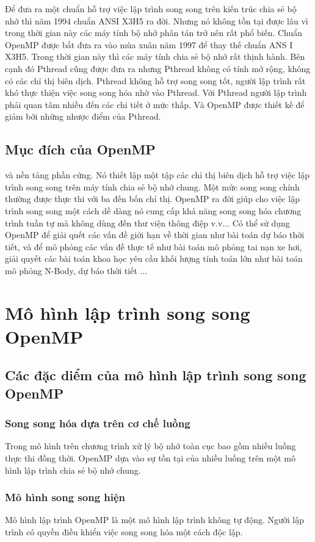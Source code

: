 \documentclass{report}
\begin{document}
Để đưa ra một chuẩn hỗ trợ việc lập trình song song trên kiến trúc chia sẻ bộ
nhớ thì năm 1994 chuẩn ANSI X3H5 ra đời. Nhưng nó không tồn tại được lâu vì trong
thời gian này các máy tính bộ nhớ phân tán trở nên rất phổ biến. Chuẩn OpenMP được
bắt đưa ra vào mùa xuân năm 1997 để thay thế chuẩn ANS
I X3H5. Trong thời gian
này thì các máy tính chia sẻ bộ nhớ rất thịnh hành.
Bên cạnh đó Pthread cũng được đưa ra nhưng Pthread không có tính mở rộng,
không có các chỉ thị biên dịch. Pthread không hỗ trợ song song tốt, người lập trình rất
khó thực thiện việc song song hóa nhờ vào Pthread. Với Pthread người lập trình phải
quan tâm nhiều đến các chi tiết ở mức thấp. Và OpenMP được thiết kế để giảm bới
những nhược điểm của Pthread.

\subsection{Mục đích của OpenMP}
và nền tảng phần cứng. Nó thiết lập một tập các chỉ thị biên dịch hỗ trợ việc lập
trình song song trên máy tính chia sẻ bộ nhớ chung. Một mức song song chính thường
được thực thi với ba đến bốn chỉ thị. OpenMP ra đời giúp cho việc lập trình song song
một cách dễ dàng nó cung cấp khả năng song song hóa chương trình tuần tự mà không
dùng đến thư viện thông điệp v.v...
Có thể sử dụng OpenMP để giải quết các vấn đề giới hạn về thời gian như bài
toán dự báo thời tiết, và để mô phỏng các vấn đề thực tế như bài toán mô phỏng tai
nạn xe hơi, giải quyết các bài toán khoa học yêu cầu khối lượng tính toán lớn như bài
toán mô phỏng N-Body, dự báo thời tiết ...


\section{Mô hình lập trình song song OpenMP}
\subsection{Các đặc diểm của mô hình lập trình song song OpenMP}
\subsubsection{Song song hóa dựa trên cơ chế luồng}
Trong mô hình trên chương trình xử lý bộ nhớ toàn cục bao gồm nhiều luồng thực thi đồng thời. OpenMP dựa vào sự tồn tại của nhiều luồng trên một mô hình lập trình chia sẻ bộ nhớ chung.
\subsubsection{Mô hình song song hiện}
Mô hình lập trình OpenMP là một mô hình lập trình không tự động. Người lập trình có quyền điều khiển việc song song hóa một cách độc lập.
\end{document}
